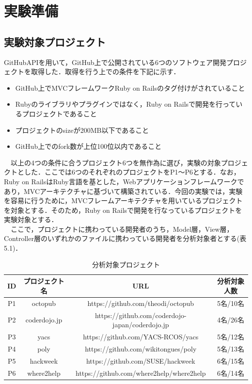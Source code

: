 \documentclass{funthesis}
\begin{document}
\section{実験準備}
\subsection{実験対象プロジェクト}
GitHubAPIを用いて，GitHub上で公開されている6つのソフトウェア開発プロジェクトを取得した．取得を行う上での条件を下記に示す．
\begin{itemize}
 \item GitHub上でMVCフレームワークRuby on Railsのタグ付けがされていること
 \item Rubyのライブラリやプラグインではなく，Ruby on Railsで開発を行っているプロジェクトであること
 \item プロジェクトのsizeが200MB以下であること
 \item GitHub上でのfork数が上位100位以内であること
\end{itemize}
　以上の4つの条件に合うプロジェクト6つを無作為に選び，実験の対象プロジェクトとした．ここでは6つのそれぞれのプロジェクトをP1〜P6とする．なお，Ruby on Rails\cite{ruby_on_rails}はRuby言語を基とした，Webアプリケーションフレームワークであり，MVCアーキテクチャに基づいて構築されている．今回の実験では，実験を容易に行うために，MVCフレームアーキテクチャを用いているプロジェクトを対象とする．そのため，Ruby on Railsで開発を行なっているプロジェクトを実験対象とする．
\\　ここで，プロジェクトに携わっている開発者のうち，Model層，View層，Controller層のいずれかのファイルに携わっている開発者を分析対象者とする(表5.1)．

\begin{table}[htb]
  \begin{center}
    \begin{tabular}{|c||c||c||c|} \hline
      ID & プロジェクト名 & URL & 分析対象人数  \\ \hline
	  P1 & octopub & https://github.com/theodi/octopub & 5名/10名\\ \hline
      P2 & coderdojo.jp & https://github.com/coderdojo-japan/coderdojo.jp & 4名/26名\\ \hline
      P3 & yacs & https://github.com/YACS-RCOS/yacs & 5名/12名\\ \hline
      P4 & poly & https://github.com/wikitongues/poly & 5名/13名\\ \hline
      P5 & hackweek & https://github.com/SUSE/hackweek & 6名/15名\\ \hline
      P6 & where2help & https://github.com/where2help/where2help & 6名/14名\\ \hline    \end{tabular}
  \end{center}
  \caption{分析対象プロジェクト}    \label{sample}
\end{table}
\end{document}
